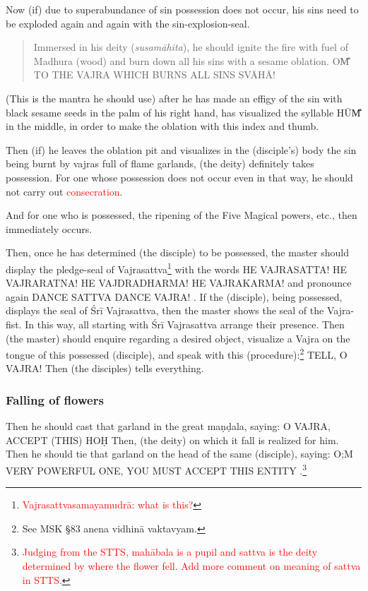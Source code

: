 \documentclass[11pt]{book}
\makeatletter
\def\fakesc#1{%
  \begingroup%
  \xdef\fake@name{\csname\curr@fontshape/\f@size\endcsname}%
  \fontsize{1.3\fontdimen8\fake@name}{\baselineskip}\selectfont%
  \uppercase{#1}%
  \endgroup%
}
\newcommand{\mantra}[1]{\fakesc{#1}}
\newcommand{\red}[1]{\textcolor{red}{#1}}
\makeatother
\begin{document}
Now (if) due to superabundance of sin possession does not occur, his sins need to be exploded again and again with the sin-explosion-seal.

\begin{verse}
Immersed in his deity (\emph{susamāhita}), he should ignite the fire with fuel of Madhura (wood) and burn down all his sins with a sesame oblation. \mantra{om̐ to the vajra which burns all sins svāhā!}
\end{verse}

(This is the mantra he should use) after he has made an effigy of the sin with black sesame seeds in the palm of his right hand, has visualized the syllable \mantra{hūm̐} in the middle, in order to make the oblation with this index and thumb.

Then (if) he leaves the oblation pit and visualizes in the (disciple's) body the sin being burnt by vajras full of flame garlands, (the deity) definitely takes possession. For one whose possession does not occur even in that way,  he should not carry out \red{consecration}.

And for one who is possessed, the ripening of the Five Magical powers, etc., then immediately occurs.

Then, once he has determined (the disciple) to be possessed, the master should display the pledge-seal of Vajrasattva\footnote{\red{Vajrasattvasamayamudrā: what is this?}} with the words \mantra{he vajrasatta! he vajraratna! he vajdradharma! he vajrakarma!} and pronounce again \mantra{dance sattva dance vajra!}. If the (disciple), being possessed, displays the seal of Śrī Vajrasattva, then the master shows the seal of the Vajra-fist. In this way, all starting with Śrī Vajrasattva arrange their presence. Then (the master) should enquire regarding a desired object, visualize a Vajra on the tongue of this possessed (disciple), and speak with this (procedure):\footnote{See MSK §83 anena vidhinā vaktavyam.} \mantra{tell, o Vajra!} Then (the disciples) tells everything.

\subsubsection{Falling of flowers}

Then he should cast that garland in the great maṇḍala, saying: \mantra{o vajra, accept (this) hoḥ} Then, (the deity) on which it fall is realized for him. Then he should tie that garland on the head of the same (disciple), saying: \mantra{o;m very powerful one, you must accept this entity}.\footnote{\red{Judging from the STTS,  mahābala is a pupil and sattva is the deity determined by where the flower fell. Add more comment on meaning of sattva in STTS.}} 
\end{document}
